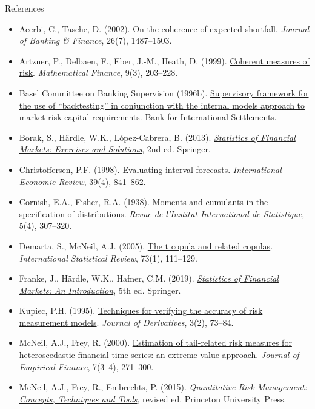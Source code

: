 \begin{frame}{References}
\itemsize{\tiny}
\begin{itemize}
    \item Acerbi, C., Tasche, D. (2002). \href{https://doi.org/10.1016/S0378-4266(02)00283-2}{On the coherence of expected shortfall}. \textit{Journal of Banking \& Finance}, 26(7), 1487--1503.
    \item Artzner, P., Delbaen, F., Eber, J.-M., Heath, D. (1999). \href{https://doi.org/10.1111/1467-9965.00068}{Coherent measures of risk}. \textit{Mathematical Finance}, 9(3), 203--228.
    \item Basel Committee on Banking Supervision (1996b). \href{https://www.bis.org/publ/bcbs22.htm}{Supervisory framework for the use of ``backtesting'' in conjunction with the internal models approach to market risk capital requirements}. Bank for International Settlements.
    \item Borak, S., Härdle, W.K., López-Cabrera, B. (2013). \href{https://doi.org/10.1007/978-3-642-33929-5}{\textit{Statistics of Financial Markets: Exercises and Solutions}}, 2nd ed. Springer.
    \item Christoffersen, P.F. (1998). \href{https://doi.org/10.2307/2527341}{Evaluating interval forecasts}. \textit{International Economic Review}, 39(4), 841--862.
    \item Cornish, E.A., Fisher, R.A. (1938). \href{https://doi.org/10.2307/1400905}{Moments and cumulants in the specification of distributions}. \textit{Revue de l'Institut International de Statistique}, 5(4), 307--320.
    \item Demarta, S., McNeil, A.J. (2005). \href{https://doi.org/10.1111/j.1751-5823.2005.tb00254.x}{The t copula and related copulas}. \textit{International Statistical Review}, 73(1), 111--129.
    \item Franke, J., Härdle, W.K., Hafner, C.M. (2019). \href{https://doi.org/10.1007/978-3-030-13751-9}{\textit{Statistics of Financial Markets: An Introduction}}, 5th ed. Springer.
    \item Kupiec, P.H. (1995). \href{https://doi.org/10.3905/jod.1995.407942}{Techniques for verifying the accuracy of risk measurement models}. \textit{Journal of Derivatives}, 3(2), 73--84.
    \item McNeil, A.J., Frey, R. (2000). \href{https://doi.org/10.1016/S0927-5398(00)00012-8}{Estimation of tail-related risk measures for heteroscedastic financial time series: an extreme value approach}. \textit{Journal of Empirical Finance}, 7(3--4), 271--300.
    \item McNeil, A.J., Frey, R., Embrechts, P. (2015). \href{https://press.princeton.edu/books/hardcover/9780691166278/quantitative-risk-management}{\textit{Quantitative Risk Management: Concepts, Techniques and Tools}}, revised ed. Princeton University Press.
\end{itemize}
\end{frame}


